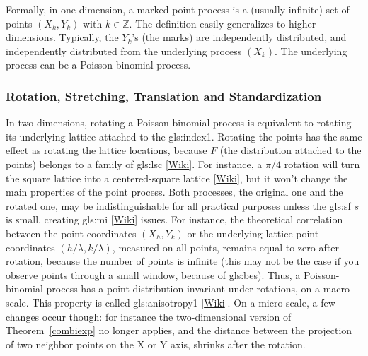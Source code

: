 \documentclass[10pt]{article}
\begin{document}
Formally, in one dimension, a marked point process is a (usually infinite) set of points $(X_k,Y_k)$ with $k\in\mathbb{Z}$. The definition easily generalizes to higher dimensions. Typically, 
 the $Y_k$'s (the marks) are independently distributed, and independently distributed from the underlying process $(X_k)$. The underlying process can be a
Poisson-binomial process.

\subsubsection{Rotation, Stretching, Translation and Standardization}\label{stret1}

In two dimensions, rotating a Poisson-binomial process is equivalent to rotating its underlying \textcolor{index}{lattice} attached to the \gls{gls:index1}. Rotating the points has the same effect as rotating the lattice locations, because $F$ (the distribution attached to the points) belongs to a family of 
\gls{gls:lsc} %
[\href{https://en.wikipedia.org/wiki/Location-scale_family}{Wiki}]. 
For instance, a $\pi/4$ rotation will turn the square lattice into a centered-square lattice [\href{https://en.wikipedia.org/wiki/Square_lattice}{Wiki}], but it won't change the main properties of the point process. Both processes, the original one and the rotated one, may be indistinguishable for all practical purposes unless the \gls{gls:sf} $s$ is small, creating
\gls{gls:mi} %
[\href{https://en.wikipedia.org/wiki/Identifiability}{Wiki}] issues. For instance, the theoretical correlation between the point coordinates $(X_h, Y_k)$ or the underlying lattice point coordinates $(h/\lambda,k/\lambda)$, measured on all points, remains equal to zero after rotation, because the number of points is infinite (this may not be the case if you observe points through a small window, because of 
\glspl{gls:be}).
Thus, a Poisson-binomial process has a point distribution invariant under rotations, on a macro-scale. This property is called 
\gls{gls:anisotropy1} [\href{https://en.wikipedia.org/wiki/Anisotropy}{Wiki}]. On a micro-scale, a few changes occur though: for instance the two-dimensional version of Theorem~\ref{combiexp} no longer applies, and the distance between the projection of two neighbor points on the X or Y axis, shrinks after the rotation. 
\end{document}
